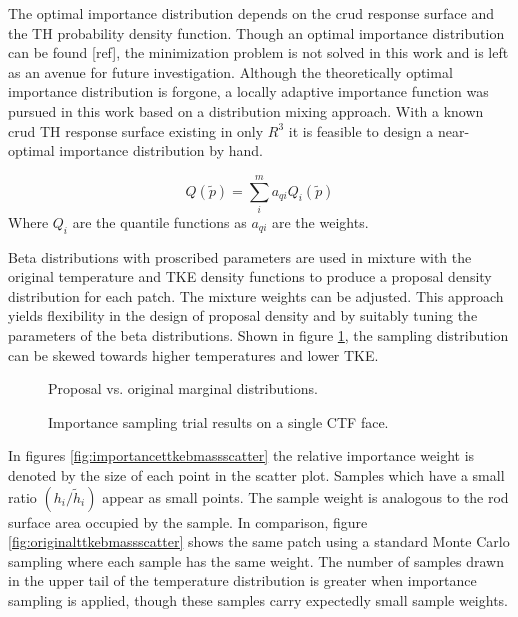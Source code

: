 The optimal importance distribution depends on the crud response surface and the TH probability density function.  Though an optimal importance distribution can be found [ref], the minimization problem is not solved in this work and is left as an avenue for future investigation.
Although the theoretically optimal importance distribution is forgone, a locally adaptive importance function was pursued in this work based on a distribution mixing approach.  With a known crud TH response surface existing in only $R^3$ it is feasible to design a near-optimal importance distribution by hand.

\begin{equation}
Q(\tilde{p}) = \sum_i^m a_{qi} Q_i(\tilde{p})
\end{equation}
Where $Q_i$ are the quantile functions as $a_{qi}$ are the weights.

Beta distributions with proscribed parameters are used in mixture with the original temperature and TKE density functions to produce a proposal density distribution for each patch.  The mixture weights can be adjusted.  This approach yields flexibility in the design of proposal density and by suitably tuning the parameters of the beta distributions.  Shown in figure \ref{fig:imp_sample2}, the sampling distribution can be skewed towards higher temperatures and lower TKE.

\begin{figure}[H]%
    \centering
    \qquad
    \caption[]{Proposal vs. original marginal distributions.}%
    \label{fig:imp_sample2}%
\end{figure}


\begin{figure}[H]%
    \centering
    \qquad
    \caption[]{Importance sampling trial results on a single CTF face.}%
    \label{fig:imp_sample1}%
\end{figure}

In figures \ref{fig:importancettkebmassscatter} the relative importance weight is denoted by the size of each point in the scatter plot.  Samples which have a small ratio $(h_i/\tilde h_i)$ appear as small points.  The sample weight is analogous to the rod surface area occupied by the sample.  In comparison, figure \ref{fig:originalttkebmassscatter} shows the same patch using a standard Monte Carlo sampling where each sample has the same weight.  The number of samples drawn in the upper tail of the temperature distribution is greater when importance sampling is applied, though these samples carry expectedly small sample weights.


